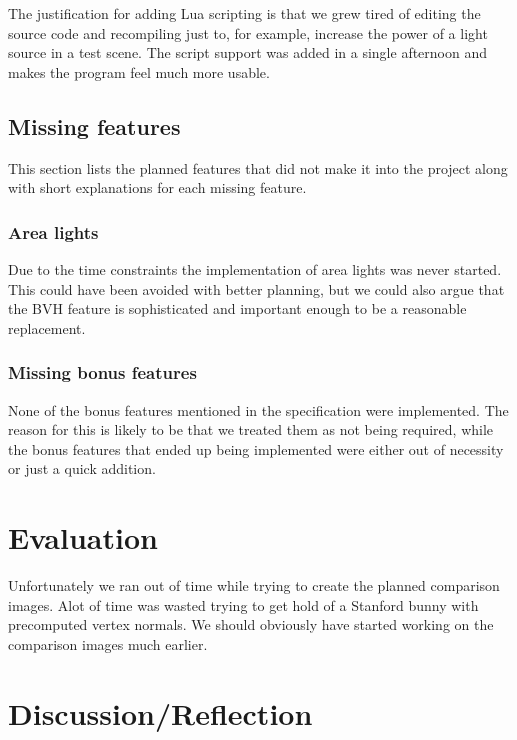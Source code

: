 \documentclass[a4paper,11pt]{article}
\begin{document}
The justification for adding Lua scripting is that we grew tired of editing the source
code and recompiling just to, for example, increase the power of a light source in a test
scene. The script support was added in a single afternoon and makes the program feel
much more usable.

\subsection{Missing features}
This section lists the planned features that did not make it into the project
along with short explanations for each missing feature.

\subsubsection{Area lights}
Due to the time constraints the implementation of area lights was never started.
This could have been avoided with better planning, but we could also argue that
the BVH feature is sophisticated and important enough to be a reasonable replacement.

\subsubsection{Missing bonus features}
None of the bonus features mentioned in the specification were implemented. The reason
for this is likely to be that we treated them as not being required, while the bonus
features that ended up being implemented were either out of necessity or just a quick addition.

\section{Evaluation}
Unfortunately we ran out of time while trying to create the planned comparison images. Alot
of time was wasted trying to get hold of a Stanford bunny with precomputed vertex normals.
We should obviously have started working on the comparison images much earlier.

\section{Discussion/Reflection}
\end{document}
